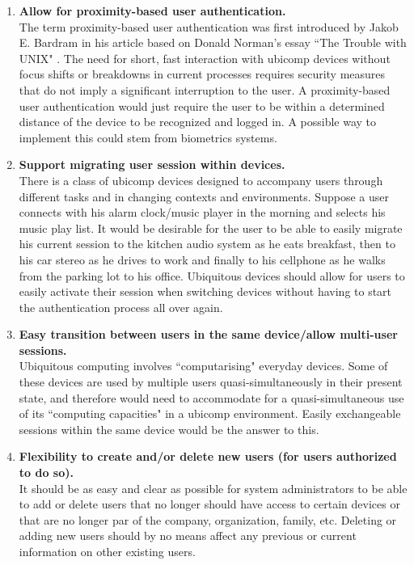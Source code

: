 \documentclass{article}
\begin{document}
\begin{enumerate}
 \item \textbf{Allow for proximity-based user authentication.}\\
 The term proximity-based user authentication was first introduced by Jakob E. Bardram\cite{bardram2005trouble} in his article based on Donald Norman's essay ``The Trouble with UNIX" \cite{norman1981trouble}. The need for short, fast interaction with ubicomp devices without focus shifts or breakdowns in current processes requires security measures that do not imply a significant interruption to the user. A proximity-based user authentication would just require the user to be within a determined distance of the device to be recognized and logged in. A possible way to implement this could stem from biometrics systems. 
 
 \item \textbf{Support migrating user session within devices.}\\
 There is a class of ubicomp devices designed to accompany users through different tasks and in changing contexts and environments. Suppose a user connects with his alarm clock/music player in the morning and selects his music play list. It would be desirable for the user to be able to easily migrate his current session to the kitchen audio system as he eats breakfast, then to his car stereo as he drives to work and finally to his cellphone as he walks from the parking lot to his office. Ubiquitous devices should allow for users to easily activate their session when switching devices without having to start the authentication process all over again. 
 
 \item \textbf{Easy transition between users in the same device/allow multi-user sessions.}\\
 Ubiquitous computing involves ``computarising" everyday devices. Some of these devices are used by multiple users quasi-simultaneously in their present state, and therefore would need to accommodate for a quasi-simultaneous use of its ``computing capacities" in a ubicomp environment. Easily exchangeable sessions within the same device would be the answer to this.
 
 \item \textbf{Flexibility to create and/or delete new users (for users authorized to do so).}\\
 It should be as easy and clear as possible for system administrators to be able to add or delete users that no longer should have access to certain devices or that are no longer par of the company, organization, family, etc.  Deleting or adding new users should by no means affect any previous or current information on other existing users.


\end{enumerate}
\end{document}
